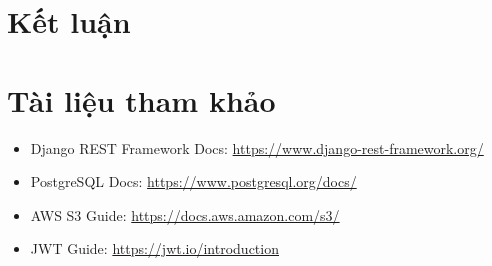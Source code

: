 \documentclass[12pt,a4paper]{report}
\begin{document}
\chapter{Kết luận}

\chapter{Tài liệu tham khảo}
\begin{itemize}
    \item Django REST Framework Docs: \url{https://www.django-rest-framework.org/}
    \item PostgreSQL Docs: \url{https://www.postgresql.org/docs/}
    \item AWS S3 Guide: \url{https://docs.aws.amazon.com/s3/}
    \item JWT Guide: \url{https://jwt.io/introduction}
\end{itemize}
\end{document}
